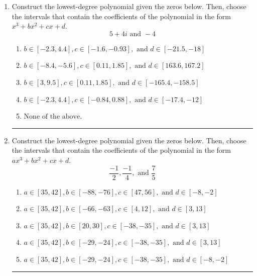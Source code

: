 \documentclass[14pt]{extbook}
\newcommand{\litem}[1]{\item#1\hspace*{-1cm}\rule{\textwidth}{0.4pt}}
\begin{document}
\begin{enumerate}
\litem{
Construct the lowest-degree polynomial given the zeros below. Then, choose the intervals that contain the coefficients of the polynomial in the form $x^3+bx^2+cx+d$.\[ 5 + 4 i \text{ and } -4 \]\begin{enumerate}[label=\Alph*.]
\item \( b \in [-2.3, 4.4], c \in [-1.6, -0.93], \text{ and } d \in [-21.5, -18] \)
\item \( b \in [-8.4, -5.6], c \in [0.11, 1.85], \text{ and } d \in [163.6, 167.2] \)
\item \( b \in [3, 9.5], c \in [0.11, 1.85], \text{ and } d \in [-165.4, -158.5] \)
\item \( b \in [-2.3, 4.4], c \in [-0.84, 0.88], \text{ and } d \in [-17.4, -12] \)
\item \( \text{None of the above.} \)

\end{enumerate} }
\litem{
Construct the lowest-degree polynomial given the zeros below. Then, choose the intervals that contain the coefficients of the polynomial in the form $ax^3+bx^2+cx+d$.\[ \frac{-1}{2}, \frac{-1}{4}, \text{ and } \frac{7}{5} \]\begin{enumerate}[label=\Alph*.]
\item \( a \in [35, 42], b \in [-88, -76], c \in [47, 56], \text{ and } d \in [-8, -2] \)
\item \( a \in [35, 42], b \in [-66, -63], c \in [4, 12], \text{ and } d \in [3, 13] \)
\item \( a \in [35, 42], b \in [20, 30], c \in [-38, -35], \text{ and } d \in [3, 13] \)
\item \( a \in [35, 42], b \in [-29, -24], c \in [-38, -35], \text{ and } d \in [3, 13] \)
\item \( a \in [35, 42], b \in [-29, -24], c \in [-38, -35], \text{ and } d \in [-8, -2] \)


\end{enumerate}}
\end{enumerate}
\end{document}
